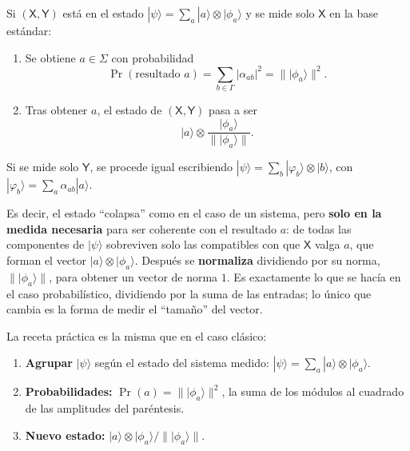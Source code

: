 \documentclass[11pt, a4paper, twoside, openright]{report}
\begin{document}
\begin{tcolorbox}[colback=teal!5!white,colframe=teal!75!black,title=\textbf{Regla de la medición parcial (caso cuántico)}]
Si $(\mathsf{X},\mathsf{Y})$ está en el estado $|\psi\rangle = \sum_{a}|a\rangle\otimes|\phi_a\rangle$ y se mide solo $\mathsf{X}$ en la base estándar:
\begin{enumerate}
    \item Se obtiene $a\in\Sigma$ con probabilidad
    \[ \Pr(\text{resultado } a) = \sum_{b\in\Gamma}|\alpha_{ab}|^2 = \big\||\phi_a\rangle\big\|^2. \]
    \item Tras obtener $a$, el estado de $(\mathsf{X},\mathsf{Y})$ pasa a ser
    \[ |a\rangle\otimes\frac{|\phi_a\rangle}{\big\||\phi_a\rangle\big\|}. \]
\end{enumerate}
Si se mide solo $\mathsf{Y}$, se procede igual escribiendo $|\psi\rangle = \sum_{b}|\varphi_b\rangle\otimes|b\rangle$, con $|\varphi_b\rangle = \sum_a\alpha_{ab}|a\rangle$.
\end{tcolorbox}

\noindent Es decir, el estado ``colapsa'' como en el caso de un sistema, pero \textbf{solo en la medida necesaria} para ser coherente con el resultado $a$: de todas las componentes de $|\psi\rangle$ sobreviven solo las compatibles con que $\mathsf{X}$ valga $a$, que forman el vector $|a\rangle\otimes|\phi_a\rangle$. Después se \textbf{normaliza} dividiendo por su norma, $\||\phi_a\rangle\|$, para obtener un vector de norma $1$. Es exactamente lo que se hacía en el caso probabilístico, dividiendo por la suma de las entradas; lo único que cambia es la forma de medir el ``tamaño'' del vector.

\noindent La receta práctica es la misma que en el caso clásico:
\begin{enumerate}
    \item \textbf{Agrupar} $|\psi\rangle$ según el estado del sistema medido: $|\psi\rangle = \sum_a|a\rangle\otimes|\phi_a\rangle$.
    \item \textbf{Probabilidades:} $\Pr(a) = \||\phi_a\rangle\|^2$, la suma de los módulos al cuadrado de las amplitudes del paréntesis.
    \item \textbf{Nuevo estado:} $|a\rangle\otimes|\phi_a\rangle/\||\phi_a\rangle\|$.
\end{enumerate}
\end{document}
